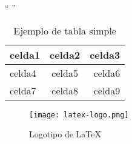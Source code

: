 “ ”

\begin{table}
\centering
\begin{tabular}{ |l|c|r| }
\hline
celda1 & celda2 & celda3 \\
\hline
celda4 & celda5 & celda6 \\
celda7 & celda8 & celda9 \\
\hline
\end{tabular}
\caption{Ejemplo de tabla simple}
\label{table:tabla-ejemplo}
\end{table}

\begin{figure}[hbt!]
    \centering
    {\texttt{[image: latex-logo.png]}}
    \caption{Logotipo de \LaTeX}
    \label{img:latex-logo}
\end{figure}


